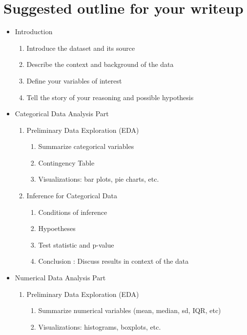 \documentclass[12pt]{article}
\begin{document}
\section*{Suggested outline for your writeup}
\begin{itemize}
    \item Introduction
    \begin{enumerate}
        \item Introduce the dataset and its source
        \item Describe the context and background of the data
        \item  Define your variables of interest
        \item Tell the story of your reasoning and possible hypothesis
    \end{enumerate}
    \item Categorical Data Analysis Part
    \begin{enumerate}
        \item Preliminary Data Exploration (EDA) 
            \begin{enumerate}
            \item Summarize categorical variables
            \item Contingency Table 
            \item Visualizations: bar plots, pie charts, etc.
            \end{enumerate} 
        \item Inference for Categorical Data
        \begin{enumerate}
            \item Conditions of inference
            \item Hypoetheses
            \item Test statistic and p-value
            \item Conclusion : Discuss results in context of the data
        \end{enumerate}
    \end{enumerate}
    \item Numerical Data Analysis Part
        \begin{enumerate}
             \item Preliminary Data Exploration (EDA) 
            \begin{enumerate}
                \item Summarize numerical variables (mean, median, sd, IQR, etc)
                \item Visualizations: histograms, boxplots, etc.

\end{enumerate}
\end{enumerate}
\end{itemize}
\end{document}
